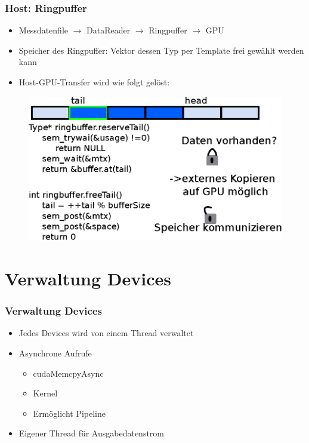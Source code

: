 \documentclass[ddcfooter]{tudbeamer}
\begin{document}
\begin{frame}
    \frametitle*{Host: Ringpuffer}
    \begin{itemize}
        \item Messdatenfile $\rightarrow$ DataReader $\rightarrow$ Ringpuffer $\rightarrow$ GPU
        \item Speicher des Ringpuffer: Vektor dessen Typ per Template frei gewählt werden kann
        \item Host-GPU-Transfer wird wie folgt gelöst:
    \end{itemize}
    \begin{figure}
        \centering
        \includegraphics[scale=.5]{Ringbuffer.eps}
    \end{figure}
\end{frame}
\section{Verwaltung Devices}
\begin{frame}
    \frametitle*{Verwaltung Devices}
    \begin{itemize}
    	\item{Jedes Devices wird von einem Thread verwaltet}
    	\item{Asynchrone Aufrufe}
		\begin{itemize}
			\item{cudaMemcpyAsync}
			\item{Kernel}
			\item{Ermöglicht Pipeline}
		\end{itemize}
    	\item{Eigener Thread für Ausgabedatenstrom}
    \end{itemize}
\end{frame}
\end{document}
